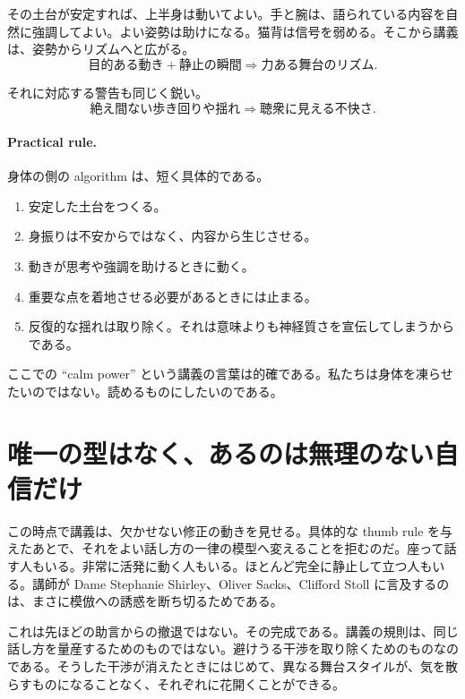 その土台が安定すれば、上半身は動いてよい。手と腕は、語られている内容を自然に強調してよい。よい姿勢は助けになる。猫背は信号を弱める。そこから講義は、姿勢からリズムへと広がる。
\begin{equation}
\text{目的ある動き} + \text{静止の瞬間} \Longrightarrow \text{力ある舞台のリズム}.
\end{equation}

それに対応する警告も同じく鋭い。
\begin{equation}
\text{絶え間ない歩き回りや揺れ} \Longrightarrow \text{聴衆に見える不快さ}.
\end{equation}

\paragraph{Practical rule.} 身体の側の algorithm は、短く具体的である。
\begin{enumerate}
\item 安定した土台をつくる。
\item 身振りは不安からではなく、内容から生じさせる。
\item 動きが思考や強調を助けるときに動く。
\item 重要な点を着地させる必要があるときには止まる。
\item 反復的な揺れは取り除く。それは意味よりも神経質さを宣伝してしまうからである。
\end{enumerate}

ここでの ``calm power'' という講義の言葉は的確である。私たちは身体を凍らせたいのではない。読めるものにしたいのである。

\section{唯一の型はなく、あるのは無理のない自信だけ}

この時点で講義は、欠かせない修正の動きを見せる。具体的な thumb rule を与えたあとで、それをよい話し方の一律の模型へ変えることを拒むのだ。座って話す人もいる。非常に活発に動く人もいる。ほとんど完全に静止して立つ人もいる。講師が Dame Stephanie Shirley、Oliver Sacks、Clifford Stoll に言及するのは、まさに模倣への誘惑を断ち切るためである。

これは先ほどの助言からの撤退ではない。その完成である。講義の規則は、同じ話し方を量産するためのものではない。避けうる干渉を取り除くためのものなのである。そうした干渉が消えたときにはじめて、異なる舞台スタイルが、気を散らすものになることなく、それぞれに花開くことができる。

